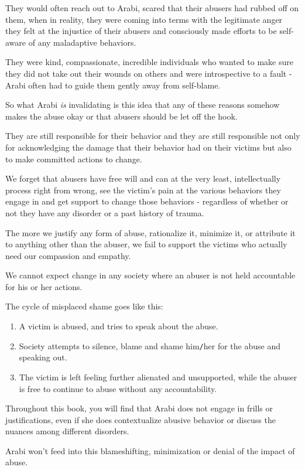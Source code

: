 \documentclass[oneside]{book}
\numberwithin{equation}{section}
\begin{document}
They would often reach out to Arabi, scared that their abusers had rubbed off on them, when in reality, they were coming into terms with the legitimate anger they felt at the injustice of their abusers and consciously made efforts to be self-aware of any maladaptive behaviors.

They were kind, compassionate, incredible individuals who wanted to make sure they did not take out their wounds on others and were introspective to a fault - Arabi often had to guide them gently away from self-blame.

%
So what Arabi \textit{is} invalidating is this idea that any of these reasons somehow makes the abuse okay or that abusers should be let off the hook.

They are still responsible for their behavior and they are still responsible not only for acknowledging the damage that their behavior had on their victims but also to make committed actions to change.

We forget that abusers have free will and can at the very least, intellectually process right from wrong, see the victim's pain at the various behaviors they engage in and get support to change those behaviors - regardless of whether or not they have any disorder or a past history of trauma.

%
The more we justify any form of abuse, rationalize it, minimize it, or attribute it to anything other than the abuser, we fail to support the victims who actually need our compassion and empathy.

We cannot expect change in any society where an abuser is not held accountable for his or her actions.

%
The cycle of misplaced shame goes like this:
\begin{enumerate}
    \item A victim is abused, and tries to speak about the abuse.
    \item Society attempts to silence, blame and shame him\texttt{/}her for the abuse and speaking out.
    \item The victim is left feeling further alienated and unsupported, while the abuser is free to continue to abuse without any accountability.
\end{enumerate}
Throughout this book, you will find that Arabi does not engage in frills or justifications, even if she does contextualize abusive behavior or discuss the nuances among different disorders.

Arabi won't feed into this blameshifting, minimization or denial of the impact of abuse.
\end{document}
